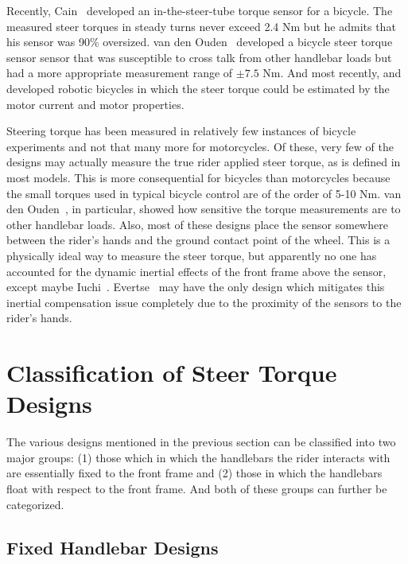 \documentclass[10pt]{article}
\begin{document}
Recently, Cain~\cite{Cain2010,Cain2012} developed an in-the-steer-tube torque
sensor for a bicycle. The measured steer torques in steady turns never exceed
2.4 Nm but he admits that his sensor was 90\% oversized. van den
Ouden~\cite{Ouden2011} developed a bicycle steer torque sensor sensor that was
susceptible to cross talk from other handlebar loads but had a more appropriate
measurement range of $\pm7.5$ Nm. And most recently, \cite{Appelman2012} and
\cite{Peterson2013} developed robotic bicycles in which the steer torque could
be estimated by the motor current and motor properties.



Steering torque has been measured in relatively few instances of bicycle
experiments and not that many more for motorcycles. Of these, very few of the
designs may actually measure the true rider applied steer torque, as is defined
in most models. This is more consequential for bicycles than motorcycles
because the small torques used in typical bicycle control are of the order of
5-10 Nm. van den Ouden~\cite{Ouden2011}, in particular, showed how sensitive
the torque measurements are to other handlebar loads. Also, most of these
designs place the sensor somewhere between the rider's hands and the ground
contact point of the wheel. This is a physically ideal way to measure the steer
torque, but apparently no one has accounted for the dynamic inertial effects of
the front frame above the sensor, except maybe Iuchi~\cite{Iuchi2006}.
Evertse~\cite{Evertse2010} may have the only design which mitigates this
inertial compensation issue completely due to the proximity of the sensors to
the rider's hands.

\section*{Classification of Steer Torque Designs}

The various designs mentioned in the previous section can be classified into
two major groups: (1) those which in which the handlebars the rider interacts
with are essentially fixed to the front frame and (2) those in which the
handlebars float with respect to the front frame. And both of these groups can
further be categorized.

\subsection*{Fixed Handlebar Designs}
\end{document}
